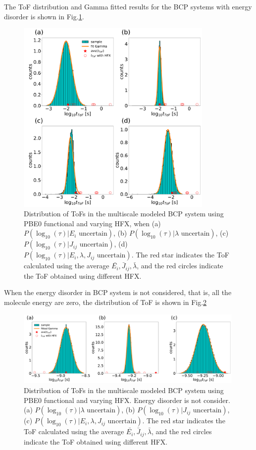 \documentclass[letterpaper,12pt]{article}
\begin{document}
The ToF distribution and Gamma fitted results for the BCP systems with energy disorder is shown in Fig.\ref{fig:mle_BCP_withE}.
\begin{figure}[H]
    \centering
    \includegraphics[width=0.85\textwidth]{figs/BCP_HFX/fig_mle_BCP_withE.pdf}
    \caption{Distribution of ToFs in the multiscale modeled BCP system using PBE0 functional and varying HFX,  when 
    (a) $P(\log_{10}(\tau)|E_i \text{ uncertain})$, 
    (b) $P(\log_{10}(\tau)|\lambda \text{ uncertain})$, 
    (c) $P(\log_{10}(\tau)|J_{ij} \text{ uncertain})$, 
    (d) $P(\log_{10}(\tau)|E_i, \lambda, J_{ij} \text{ uncertain})$. The red star indicates the ToF calculated using the average $\bar{E_i}, \bar{J}_{ij}, \bar{\lambda}$, and the red circles indicate the ToF obtained using different HFX.}
    \label{fig:mle_BCP_withE}
\end{figure}

When the energy disorder in BCP system is not considered, that is, all the molecule energy are zero, the distribution of ToF is shown in Fig.\ref{fig:mle_BCP_noE}
\begin{figure}[H]
    \centering
    \includegraphics[width=0.99\textwidth]{figs/BCP_HFX/fig_mle_BCP_noE.pdf}
    \caption{Distribution of ToFs in the multiscale modeled BCP system using PBE0 functional and varying HFX. Energy disorder is not consider. 
    (a) $P(\log_{10}(\tau)|\lambda \text{ uncertain})$, 
    (b) $P(\log_{10}(\tau)|J_{ij} \text{ uncertain})$, 
    (c) $P(\log_{10}(\tau)|E_i, \lambda, J_{ij} \text{ uncertain})$. The red star indicates the ToF calculated using the average $\bar{E_i}, \bar{J}_{ij}, \bar{\lambda}$, and the red circles indicate the ToF obtained using different HFX.}
    \label{fig:mle_BCP_noE}
\end{figure}
\end{document}
